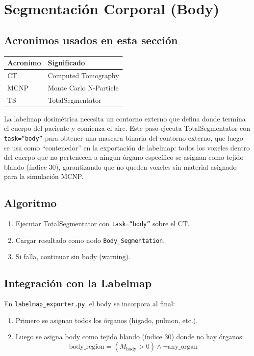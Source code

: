 \documentclass[12pt,a4paper]{article}
\begin{document}
\section{Segmentación Corporal (Body)}
\label{sec:body}

\subsection*{Acronimos usados en esta sección}
\begin{tabular}{ll}
\toprule
\textbf{Acronimo} & \textbf{Significado} \\
\midrule
CT & Computed Tomography \\
MCNP & Monte Carlo N-Particle \\
TS & TotalSegmentator \\
\bottomrule
\end{tabular}

La labelmap dosimétrica necesita un contorno externo que defina donde termina el cuerpo del
paciente y comienza el aire. Este paso ejecuta TotalSegmentator con \texttt{task=``body''} para
obtener una mascara binaria del contorno externo, que luego se usa como ``contenedor'' en la
exportación de labelmap: todos los voxeles dentro del cuerpo que no pertenecen a ningun órgano
específico se asignan como tejido blando (índice 30), garantizando que no queden voxeles sin
material asignado para la simulación MCNP.

\subsection{Algoritmo}

\begin{enumerate}
    \item Ejecutar TotalSegmentator con \texttt{task=``body''} sobre el CT.
    \item Cargar resultado como nodo \texttt{Body\_Segmentation}.
    \item Si falla, continuar sin body (warning).
\end{enumerate}

\subsection{Integración con la Labelmap}

En \texttt{labelmap\_exporter.py}, el body se incorpora al final:

\begin{enumerate}
    \item Primero se asignan todos los órganos (higado, pulmon, etc.).
    \item Luego se asigna body como tejido blando (índice 30) donde no hay órganos:
          \begin{equation}\label{eq:body_labelmap}
              \text{body\_region} = (M_{\text{body}} > 0) \land
              \lnot \text{any\_organ}
          \end{equation}
\end{enumerate}
\end{document}
